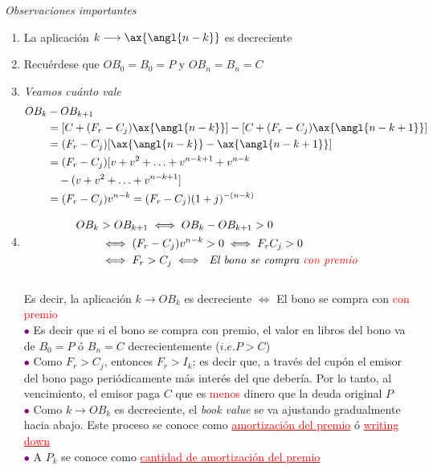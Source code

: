 \textit{Observaciones importantes}
\begin{enumerate}
    \item La aplicación $k\longrightarrow \ax{\angl{n-k}}$ es decreciente
    \item Recuérdese que $OB_0 = B_0 =P$ y $OB_n=B_n=C$
    \item \textit{Veamos cuánto vale}\begin{align*}
        OB_k& - OB_{k+1}\\
        &= [C+(F_r-C_j)\ax{\angl{n-k}}] - [C+(F_r-C_j)\ax{\angl{n-k+1}}]\\
        &= (F_r-C_j)[\ax{\angl{n-k}} - \ax{\angl{n-k+1}}]\\
        &= (F_r-C_j)[v+v^2+\dotsc+v^{n-k+1} + v^{n-k}\\
        &\quad -(v+v^2+\dotsc+v^{n-k+1}]\\
        &= (F_r-C_j)v^{n-k} = (F_r-C_j)(1+j)^{-(n-k)}
    \end{align*}
    \item \begin{align*}
        OB_k &> OB_{k+1} \iff OB_k-OB_{k+1} >0\\
        &\iff (F_r-C_j)v^{n-k} >0 \iff F_rC_j>0\\
        &\iff F_r>C_j \iff \textit{ El bono se compra \textcolor{red}{con premio}}
    \end{align*}\\
    Es decir, la aplicación $k\longrightarrow OB_k$ es decreciente $\iff$ El bono se compra con \textcolor{red}{con premio}\\
    \textcolor{purple}{$\bullet$} Es decir que si el bono se compra con premio, el valor en libros del bono va de $B_0=P$ ó $B_n=C$ decrecientemente ($i.e. P>C$)\\
    \textcolor{purple}{$\bullet$} Como $F_r>C_j$, entonces $F_r>I_k$; es decir que, a través del cupón el emisor del bono pago periódicamente más interés del que debería. Por lo tanto, al vencimiento, el emisor paga $C$ que es \textcolor{red}{menos} dinero que la deuda original $P$\\
    \textcolor{purple}{$\bullet$} Como $k\longrightarrow OB_k$ es decreciente, el \textit{book value} se va ajustando gradualmente hacia abajo. Este proceso se conoce como \textcolor{red}{\underline{amortización del premio}} ó \textcolor{red}{\underline{writing down}}\\
    \textcolor{purple}{$\bullet$} A $P_k$ se conoce como \textcolor{red}{\underline{cantidad de amortización del premio}}

\end{enumerate}

